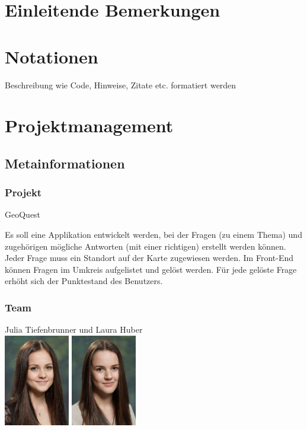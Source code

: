 \def \currentAuthor {Gabi Sorglos} %

\chapter*{Einleitende Bemerkungen}

\chapter*{Notationen}
Beschreibung wie Code, Hinweise, Zitate etc. formatiert werden  

\chapter{Projektmanagement}

\section{Metainformationen}
\subsection{Projekt}
GeoQuest

Es soll eine Applikation entwickelt werden, bei der Fragen (zu einem Thema) und zugehörigen mögliche Antworten (mit einer richtigen) erstellt werden können. Jeder Frage muss ein Standort auf der Karte zugewiesen werden. 
Im Front-End können Fragen im Umkreis aufgelistet und gelöst werden. Für jede gelöste Frage erhöht sich der Punktestand des Benutzers.
\subsection{Team}
Julia Tiefenbrunner und Laura Huber\\
\includegraphics[height=4cm]{tiefenbrunner}
\includegraphics[height=4cm]{huber}
